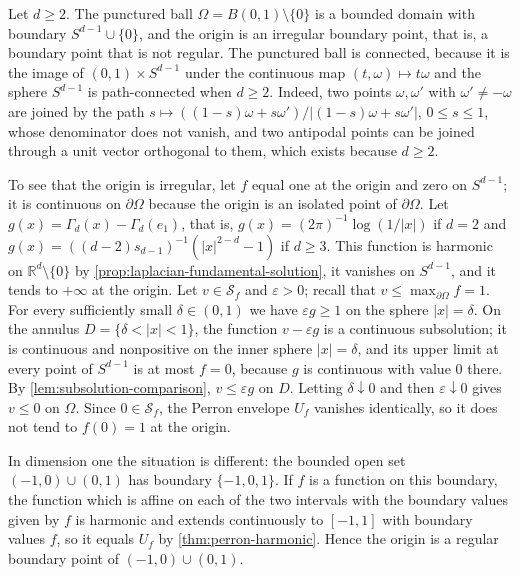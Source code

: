 \begin{example}\label{ex:punctured-ball-irregular}
Let $d\geq2$. The punctured ball $\Omega=B(0,1)\setminus\{0\}$ is a bounded domain with boundary $S^{d-1}\cup\{0\}$, and the origin is an irregular boundary point, that is, a boundary point that is not regular. The punctured ball is connected, because it is the image of $(0,1)\times S^{d-1}$ under the continuous map $(t,\omega)\mapsto t\omega$ and the sphere $S^{d-1}$ is path-connected when $d\geq2$. Indeed, two points $\omega,\omega'$ with $\omega'\neq-\omega$ are joined by the path $s\mapsto((1-s)\omega+s\omega')/|(1-s)\omega+s\omega'|$, $0\leq s\leq1$, whose denominator does not vanish, and two antipodal points can be joined through a unit vector orthogonal to them, which exists because $d\geq2$.

To see that the origin is irregular, let $f$ equal one at the origin and zero on $S^{d-1}$; it is continuous on $\partial\Omega$ because the origin is an isolated point of $\partial\Omega$. Let $g(x)=\Gamma_d(x)-\Gamma_d(e_1)$, that is, $g(x)=(2\pi)^{-1}\log(1/|x|)$ if $d=2$ and $g(x)=((d-2)s_{d-1})^{-1}(|x|^{2-d}-1)$ if $d\geq3$. This function is harmonic on $\mathbb R^d\setminus\{0\}$ by \cref{prop:laplacian-fundamental-solution}, it vanishes on $S^{d-1}$, and it tends to $+\infty$ at the origin. Let $v\in\mathcal S_f$ and $\varepsilon>0$; recall that $v\leq\max_{\partial\Omega}f=1$. For every sufficiently small $\delta\in(0,1)$ we have $\varepsilon g\geq1$ on the sphere $|x|=\delta$. On the annulus $D=\{\delta<|x|<1\}$, the function $v-\varepsilon g$ is a continuous subsolution; it is continuous and nonpositive on the inner sphere $|x|=\delta$, and its upper limit at every point of $S^{d-1}$ is at most $f=0$, because $g$ is continuous with value $0$ there. By \cref{lem:subsolution-comparison}, $v\leq\varepsilon g$ on $D$. Letting $\delta\downarrow0$ and then $\varepsilon\downarrow0$ gives $v\leq0$ on $\Omega$. Since $0\in\mathcal S_f$, the Perron envelope $U_f$ vanishes identically, so it does not tend to $f(0)=1$ at the origin.

In dimension one the situation is different: the bounded open set $(-1,0)\cup(0,1)$ has boundary $\{-1,0,1\}$. If $f$ is a function on this boundary, the function which is affine on each of the two intervals with the boundary values given by $f$ is harmonic and extends continuously to $[-1,1]$ with boundary values $f$, so it equals $U_f$ by \cref{thm:perron-harmonic}. Hence the origin is a regular boundary point of $(-1,0)\cup(0,1)$.
\end{example}

